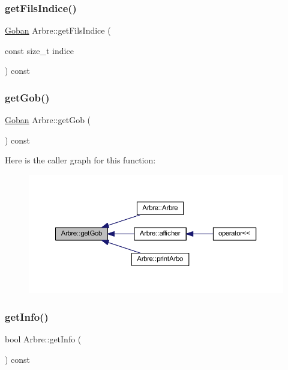 \subsubsection{\texorpdfstring{get\+Fils\+Indice()}{getFilsIndice()}}
{\footnotesize\ttfamily \hyperlink{class_goban}{Goban} Arbre\+::get\+Fils\+Indice (\begin{DoxyParamCaption}\item[{const size\+\_\+t}]{indice }\end{DoxyParamCaption}) const}

\mbox{\label{class_arbre_abb30fa37b209f6e148a5dc29e3a1c00d}} 
\subsubsection{\texorpdfstring{get\+Gob()}{getGob()}}
{\footnotesize\ttfamily \hyperlink{class_goban}{Goban} Arbre\+::get\+Gob (\begin{DoxyParamCaption}{ }\end{DoxyParamCaption}) const}

Here is the caller graph for this function\+:\nopagebreak
\begin{figure}[H]
\begin{center}
\leavevmode
\includegraphics[width=350pt]{class_arbre_abb30fa37b209f6e148a5dc29e3a1c00d_icgraph}
\end{center}
\end{figure}
\mbox{\label{class_arbre_afc71a182e86352b06193c2dc746fab79}} 
\subsubsection{\texorpdfstring{get\+Info()}{getInfo()}}
{\footnotesize\ttfamily bool Arbre\+::get\+Info (\begin{DoxyParamCaption}{ }\end{DoxyParamCaption}) const}

